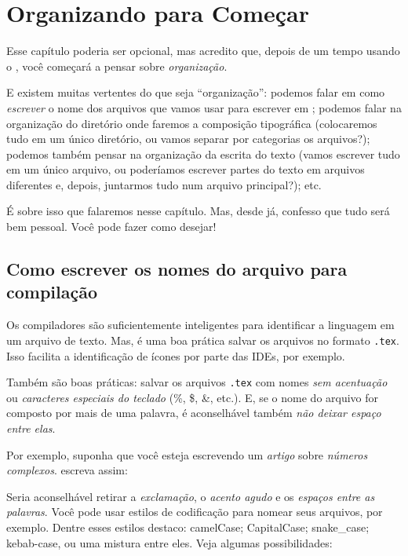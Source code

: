 \chapter{Organizando para Começar} 
\label{cap:organizando} 


Esse capítulo poderia ser opcional, mas acredito que, depois de um tempo usando 
o \LaTeXX, você começará a pensar sobre \textit{organização}. 

E existem muitas vertentes do que seja ``organização'': podemos falar em como 
\textit{escrever} o nome dos arquivos que vamos usar para escrever em \LaTeXX;
podemos falar na organização do diretório onde faremos a composição tipográfica
(colocaremos tudo em um único diretório, ou vamos separar por categorias os 
arquivos?); podemos também pensar na organização da escrita do texto (vamos 
escrever tudo em um único arquivo, ou poderíamos escrever partes do texto em 
arquivos diferentes e, depois, juntarmos tudo num arquivo principal?); etc. 

É sobre isso que falaremos nesse capítulo. 
Mas, desde já, confesso que tudo será bem pessoal. 
Você pode fazer como desejar!

\section{Como escrever os nomes do arquivo para compilação} %

Os compiladores são suficientemente inteligentes para identificar a linguagem 
{ \grega {} } em um arquivo de texto. 
Mas, é uma boa prática salvar os arquivos no formato \texttt{.tex}. 
Isso facilita a identificação de ícones por parte das IDEs, por exemplo.

Também são boas práticas: salvar os arquivos \texttt{.tex} com nomes 
\textit{sem acentuação} ou \textit{caracteres especiais do teclado} (\%, \$, \&, etc.). 
E, se o nome do arquivo for composto por mais de uma palavra, é aconselhável 
também \textit{não deixar espaço entre elas}.

Por exemplo, suponha que você esteja escrevendo um \textit{artigo} sobre 
\textit{números complexos}.  escreva assim: 


Seria aconselhável retirar a \textit{exclamação}, o \textit{acento agudo} e os 
\textit{espaços entre as palavras}. 
Você pode usar estilos de codificação para nomear seus arquivos, por exemplo. 
Dentre esses estilos destaco: \textsf{camelCase}; \textsf{CapitalCase}; 
\textsf{snake\_case}; \textsf{kebab-case}, ou uma mistura entre eles. 
Veja algumas possibilidades:

